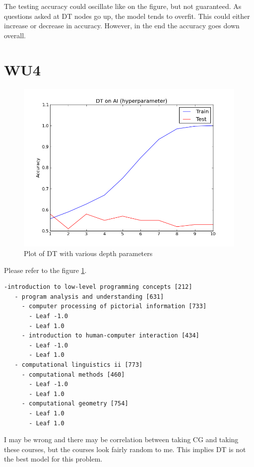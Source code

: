 The testing accuracy could oscillate like on the figure, but not guaranteed. As questions asked at DT nodes go up, the model tends to overfit. This could either increase or decrease in accuracy. However, in the end the accuracy goes down overall.

\section*{WU4}
\begin{figure}[here]
	\caption{Plot of DT with various depth parameters}
	\label{fig:dt_depth}
	\includegraphics[width=6.5in]{images/dt_depth.png}
\end{figure}

Please refer to the figure \ref{fig:dt_depth}.
  \begin{verbatim}
-introduction to low-level programming concepts [212]
   - program analysis and understanding [631]
     - computer processing of pictorial information [733]
       - Leaf -1.0
       - Leaf 1.0
     - introduction to human-computer interaction [434]
       - Leaf -1.0
       - Leaf 1.0
   - computational linguistics ii [773]
     - computational methods [460]
       - Leaf -1.0
       - Leaf 1.0
     - computational geometry [754]
       - Leaf 1.0
       - Leaf 1.0
  \end{verbatim}
I may be wrong and there may be correlation between taking CG and taking these courses, but the courses look fairly random to me. This implies DT is not the best model for this problem.

